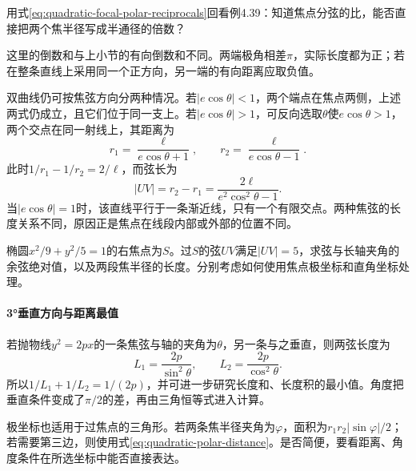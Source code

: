 用式\eqref{eq:quadratic-focal-polar-reciprocals}回看例4.39：知道焦点分弦的比，能否直接把两个焦半径写成半通径的倍数？

这里的倒数和与上小节的有向倒数和不同。两端极角相差\(\pi\)，实际长度都为正；若在整条直线上采用同一个正方向，另一端的有向距离应取负值。

双曲线仍可按焦弦方向分两种情况。若\(|e\cos\theta|<1\)，两个端点在焦点两侧，上述两式仍成立，且它们位于同一支上。若\(|e\cos\theta|>1\)，可反向选取\(\theta\)使\(e\cos\theta>1\)，两个交点在同一射线上，其距离为
\begin{equation*}
 r_1=\frac{\ell}{e\cos\theta+1},\qquad
 r_2=\frac{\ell}{e\cos\theta-1}.
\end{equation*}
此时\(1/r_1-1/r_2=2/\ell\)，而弦长为
\begin{equation}\label{eq:quadratic-hyperbola-focal-polar-chord}
 |UV|=r_2-r_1=\frac{2\ell}{e^2\cos^2\theta-1}.
\end{equation}
当\(|e\cos\theta|=1\)时，该直线平行于一条渐近线，只有一个有限交点。两种焦弦的长度关系不同，原因正是焦点在线段内部或外部的位置不同。

\par\addvspace{6pt}\noindent\begin{minipage}{\linewidth}
\begin{example}
椭圆\(x^2/9+y^2/5=1\)的右焦点为\(S\)。过\(S\)的弦\(UV\)满足\(|UV|=5\)，求弦与长轴夹角的余弦绝对值，以及两段焦半径的长度。分别考虑如何使用焦点极坐标和直角坐标处理。
\end{example}
\end{minipage}\par\addvspace{6pt}

\paragraph{3°垂直方向与距离最值} \mbox{}

若抛物线\(y^2=2px\)的一条焦弦与轴的夹角为\(\theta\)，另一条与之垂直，则两弦长度为
\begin{equation*}
 L_1=\frac{2p}{\sin^2\theta},\qquad
 L_2=\frac{2p}{\cos^2\theta}.
\end{equation*}
所以\(1/L_1+1/L_2=1/(2p)\)，并可进一步研究长度和、长度积的最小值。角度把垂直条件变成了\(\pi/2\)的差，再由三角恒等式进入计算。

极坐标也适用于过焦点的三角形。若两条焦半径夹角为\(\varphi\)，面积为\(r_1r_2|\sin\varphi|/2\)；若需要第三边，则使用式\eqref{eq:quadratic-polar-distance}。是否简便，要看距离、角度条件在所选坐标中能否直接表达。

